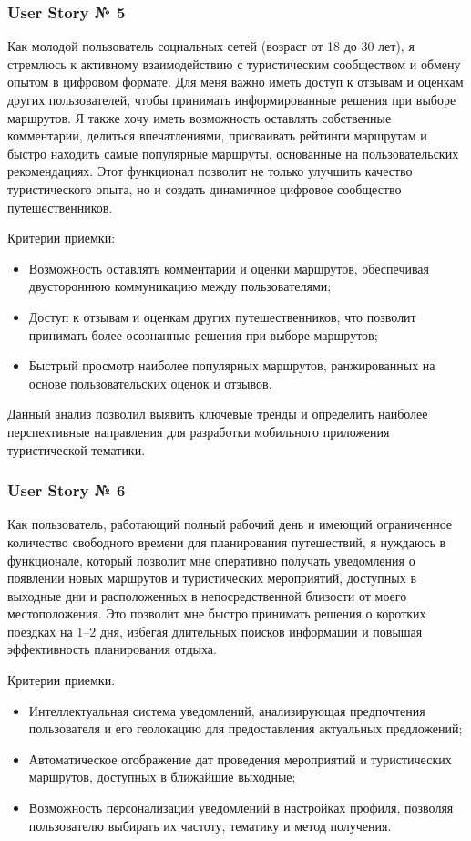 \subsubsection*{User Story № 5} 
Как молодой пользователь социальных сетей (возраст от 18 до 30 лет), я стремлюсь к активному взаимодействию с туристическим сообществом и обмену опытом в цифровом формате. Для меня важно иметь доступ к отзывам и оценкам других пользователей, чтобы принимать информированные решения при выборе маршрутов. Я также хочу иметь возможность оставлять собственные комментарии, делиться впечатлениями, присваивать рейтинги маршрутам и быстро находить самые популярные маршруты, основанные на пользовательских рекомендациях. Этот функционал позволит не только улучшить качество туристического опыта, но и создать динамичное цифровое сообщество путешественников.

Критерии приемки:
\begin{itemize}
    \item Возможность оставлять комментарии и оценки маршрутов, обеспечивая двустороннюю коммуникацию между пользователями;
    \item Доступ к отзывам и оценкам других путешественников, что позволит принимать более осознанные решения при выборе маршрутов;
    \item Быстрый просмотр наиболее популярных маршрутов, ранжированных на основе пользовательских оценок и отзывов.
\end{itemize}

\noindent Данный анализ позволил выявить ключевые тренды и определить наиболее перспективные направления для разработки мобильного приложения туристической тематики.

\subsubsection*{User Story № 6} 
Как пользователь, работающий полный рабочий день и имеющий ограниченное количество свободного времени для планирования путешествий, я нуждаюсь в функционале, который позволит мне оперативно получать уведомления о появлении новых маршрутов и туристических мероприятий, доступных в выходные дни и расположенных в непосредственной близости от моего местоположения. Это позволит мне быстро принимать решения о коротких поездках на 1–2 дня, избегая длительных поисков информации и повышая эффективность планирования отдыха.

Критерии приемки:
\begin{itemize}
    \item Интеллектуальная система уведомлений, анализирующая предпочтения пользователя и его геолокацию для предоставления актуальных предложений;
    \item Автоматическое отображение дат проведения мероприятий и туристических маршрутов, доступных в ближайшие выходные;
    \item Возможность персонализации уведомлений в настройках профиля, позволяя пользователю выбирать их частоту, тематику и метод получения.
\end{itemize}


